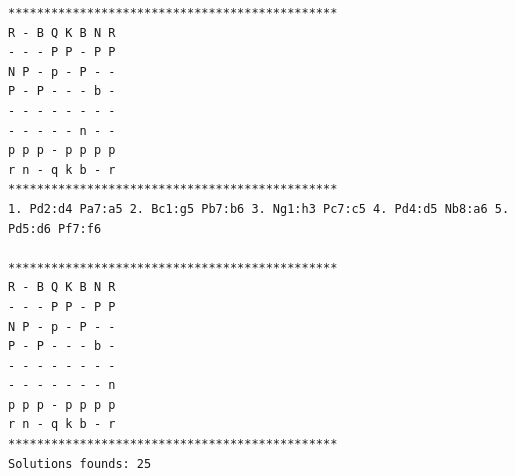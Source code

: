 \documentclass[conference]{IEEEtran}
\begin{document}
\begin{verbatim}
**********************************************
R - B Q K B N R 
- - - P P - P P 
N P - p - P - - 
P - P - - - b - 
- - - - - - - - 
- - - - - n - - 
p p p - p p p p 
r n - q k b - r 
**********************************************
1. Pd2:d4 Pa7:a5 2. Bc1:g5 Pb7:b6 3. Ng1:h3 Pc7:c5 4. Pd4:d5 Nb8:a6 5. Pd5:d6 Pf7:f6 

**********************************************
R - B Q K B N R 
- - - P P - P P 
N P - p - P - - 
P - P - - - b - 
- - - - - - - - 
- - - - - - - n 
p p p - p p p p 
r n - q k b - r 
**********************************************
Solutions founds: 25
\end{verbatim}

%



\end{document}
